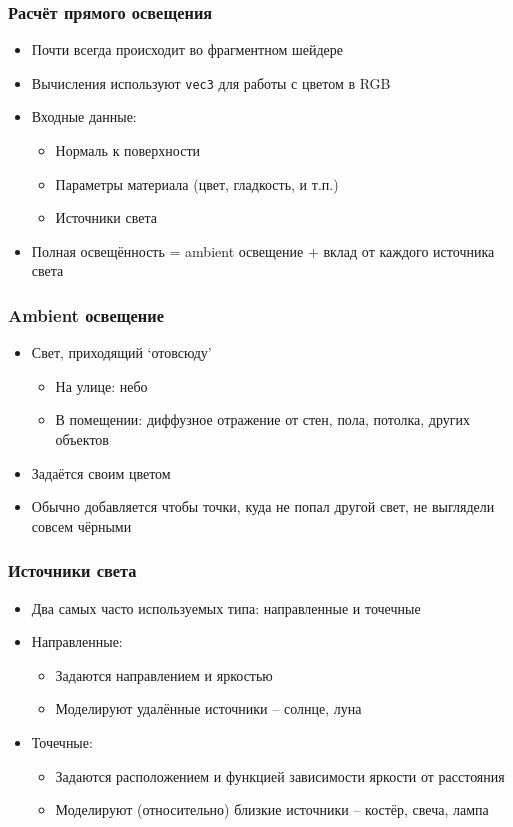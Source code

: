 \documentclass[10pt]{beamer}
\begin{document}
\begin{frame}[fragile]
\frametitle{Расчёт прямого освещения}
\begin{itemize}
\item Почти всегда происходит во фрагментном шейдере
\pause
\item Вычисления используют \verb|vec3| для работы с цветом в {\color{red}R}{\color{green}G}{\color{blue}B}
\pause
\item Входные данные:
\pause
\begin{itemize}
\item Нормаль к поверхности
\pause
\item Параметры материала (цвет, гладкость, и т.п.)
\pause
\item Источники света
\end{itemize}
\pause
\item Полная освещённость = ambient освещение + вклад от каждого источника света
\end{itemize}
\end{frame}

\begin{frame}[fragile]
\frametitle{Ambient освещение}
\begin{itemize}
\item Свет, приходящий `отовсюду'
\pause
\begin{itemize}
\item На улице: небо
\pause
\item В помещении: диффузное отражение от стен, пола, потолка, других объектов
\end{itemize}
\pause
\item Задаётся своим цветом
\pause
\item Обычно добавляется чтобы точки, куда не попал другой свет, не выглядели совсем чёрными
\end{itemize}
\end{frame}

\begin{frame}[fragile]
\frametitle{Источники света}
\begin{itemize}
\item Два самых часто используемых типа: направленные и точечные
\pause
\item Направленные:
\pause
\begin{itemize}
\item Задаются направлением и яркостью
\pause
\item Моделируют удалённые источники -- солнце, луна
\end{itemize}
\pause
\item Точечные:
\pause
\begin{itemize}
\item Задаются расположением и функцией зависимости яркости от расстояния
\pause
\item Моделируют (относительно) близкие источники -- костёр, свеча, лампа
\end{itemize}
\end{itemize}
\end{frame}
\end{document}
